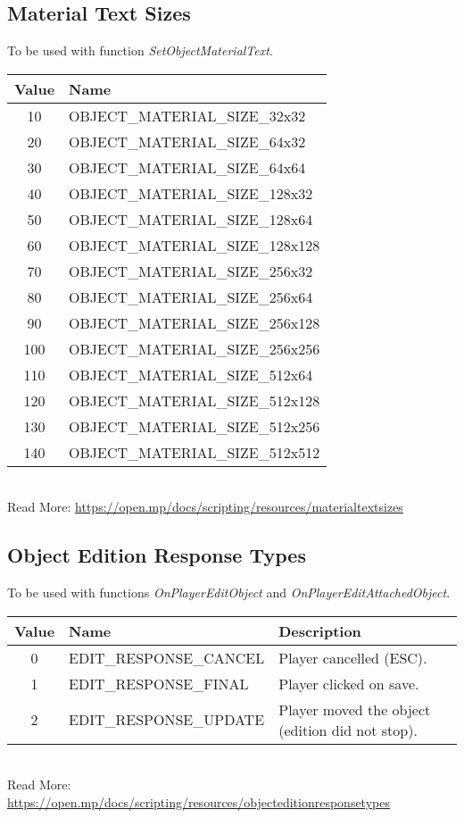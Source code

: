 \documentclass{article}
\begin{document}
\subsection{Material Text Sizes}
To be used with function \textit{SetObjectMaterialText}.
\bigskip
\\\begin{tabular}{ |c|l| }
\hline
Value & Name \\
\hline
10 & OBJECT\_MATERIAL\_SIZE\_32x32 \\
20 & OBJECT\_MATERIAL\_SIZE\_64x32 \\
30 & OBJECT\_MATERIAL\_SIZE\_64x64 \\
40 & OBJECT\_MATERIAL\_SIZE\_128x32 \\
50 & OBJECT\_MATERIAL\_SIZE\_128x64 \\
60 & OBJECT\_MATERIAL\_SIZE\_128x128 \\
70 & OBJECT\_MATERIAL\_SIZE\_256x32 \\
80 & OBJECT\_MATERIAL\_SIZE\_256x64 \\
90 & OBJECT\_MATERIAL\_SIZE\_256x128 \\
100 & OBJECT\_MATERIAL\_SIZE\_256x256 \\
110 & OBJECT\_MATERIAL\_SIZE\_512x64 \\
120 & OBJECT\_MATERIAL\_SIZE\_512x128 \\
130 & OBJECT\_MATERIAL\_SIZE\_512x256 \\
140 & OBJECT\_MATERIAL\_SIZE\_512x512 \\
\hline
\end{tabular}
\bigskip
\\Read More: \url{https://open.mp/docs/scripting/resources/materialtextsizes}


\subsection{Object Edition Response Types}
To be used with functions \textit{OnPlayerEditObject} and \textit{OnPlayerEditAttachedObject}.
\bigskip
\\\begin{tabular}{ |c|l|l| }
\hline
Value & Name & Description \\
\hline
0 & EDIT\_RESPONSE\_CANCEL & Player cancelled (ESC). \\
1 & EDIT\_RESPONSE\_FINAL & Player clicked on save. \\
2 & EDIT\_RESPONSE\_UPDATE & Player moved the object (edition did not stop). \\
\hline
\end{tabular}
\bigskip
\\Read More: \url{https://open.mp/docs/scripting/resources/objecteditionresponsetypes}
\end{document}
